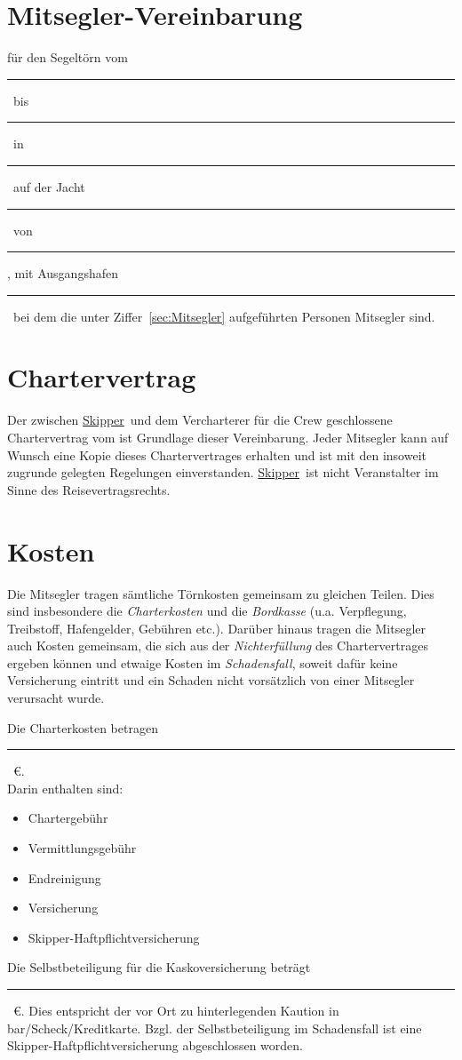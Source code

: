 \documentclass[a4paper,12pt]{article}
\newcommand{\openlength}[1]{\rule{#1}{.4pt}}
\newcommand{\openeuro}{\openlength{2cm}~\euro}
\newcommand{\open}{\openlength{3cm}}
\newcommand{\skipper}{\underline{Skipper}}
\newcommand{\departdate}{\open}
\newcommand{\returndate}{\open}
\newcommand{\location}{\open}
\newcommand{\boatname}{\open}
\newcommand{\charteree}{\open}
\newcommand{\harbour}{\open}
\begin{document}
\section*{Mitsegler-Vereinbarung}

für den Segeltörn vom \departdate\ bis \returndate\ in \location\ auf der Jacht \boatname\ von \charteree, mit Ausgangshafen \harbour\ bei dem die unter Ziffer~\ref{sec:Mitsegler} aufgeführten Personen Mitsegler sind.


\section{Chartervertrag}
\label{sec:Chartervertrag}

Der zwischen \skipper\ und dem Vercharterer für die Crew geschlossene Chartervertrag vom ist Grundlage dieser Vereinbarung.
Jeder Mitsegler kann auf Wunsch eine Kopie dieses Chartervertrages erhalten und ist mit den insoweit zugrunde gelegten Regelungen einverstanden.
\skipper\ ist nicht Veranstalter im Sinne des Reisevertragsrechts.


\section{Kosten}
\label{sec:Kosten}

Die Mitsegler tragen sämtliche Törnkosten gemeinsam zu gleichen Teilen.
Dies sind insbesondere die \textit{Charterkosten} und die \textit{Bordkasse} (u.a. Verpflegung, Treibstoff, Hafengelder, Gebühren etc.).
Darüber hinaus tragen die Mitsegler auch Kosten gemeinsam, die sich aus der \textit{Nichterfüllung} des Chartervertrages ergeben können und etwaige Kosten im \textit{Schadensfall}, soweit dafür keine Versicherung eintritt und ein Schaden nicht vorsätzlich von einer Mitsegler verursacht wurde.


Die Charterkosten betragen \openeuro.\\
Darin enthalten sind:
\begin{itemize}
	\item Chartergebühr
	\item Vermittlungsgebühr
	\item Endreinigung
	\item Versicherung
	\item Skipper-Haftpflichtversicherung
\end{itemize}

Die Selbstbeteiligung für die Kaskoversicherung beträgt \openeuro.
Dies entspricht der vor Ort zu hinterlegenden Kaution in bar/Scheck/Kreditkarte.
Bzgl. der Selbstbeteiligung im Schadensfall ist eine Skipper-Haftpflichtversicherung abgeschlossen worden.
\end{document}
